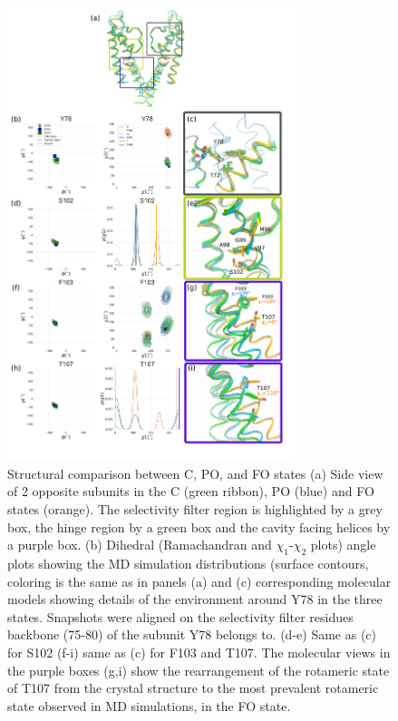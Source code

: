 \documentclass[%
 aip,
 amsmath,amssymb,
 preprint,%
]{revtex4-1}
\begin{document}
\begin{figure}[tbp]
\includegraphics[width=0.75\textwidth]{figures/bio.pdf}%
\caption{\label{bio} 
\scriptsize
    Structural comparison between C, PO, and FO states (a) Side view of 2 opposite subunits in the C (green ribbon), PO (blue) and FO states (orange). The selectivity filter region is highlighted by a grey box, the hinge region by a green box and the cavity facing helices by a purple box. (b) Dihedral (Ramachandran and $\chi_1$-$\chi_2$ plots) angle plots showing the MD simulation distributions (surface contours, coloring is the same as in panels (a) and (c) corresponding molecular models showing details of the environment around Y78 in the three states. Snapshots were aligned on the selectivity filter residues backbone (75-80) of the subunit Y78 belongs to. (d-e) Same as (c) for S102 (f-i) same as (c) for F103 and T107. The molecular views in the purple boxes (g,i) show the rearrangement of the rotameric state of T107 from the crystal structure to the most prevalent rotameric state observed in MD simulations, in the FO state.} 
\end{figure}
\end{document}
